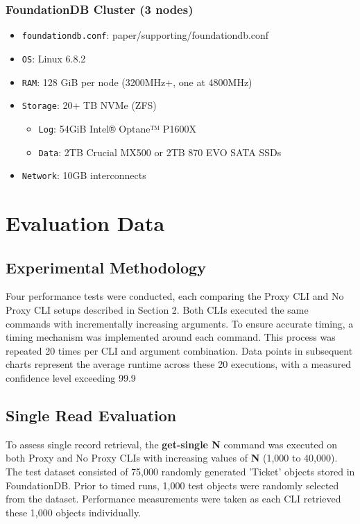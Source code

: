\documentclass[sigconf]{acmart}
\begin{document}
\subsubsection{FoundationDB Cluster (3 nodes)}

\begin{itemize}
    \item {\texttt{foundationdb.conf}}: paper/supporting/foundationdb.conf
    \item {\texttt{OS}}: Linux 6.8.2
    \item{\texttt{RAM}}: 128 GiB per node (3200MHz+, one at 4800MHz)
    \item{\texttt{Storage}}: 20+ TB NVMe (ZFS)
    \begin{itemize}
        \item{\texttt{Log}}: 54GiB Intel® Optane™ P1600X
        \item{\texttt{Data}}: 2TB Crucial MX500 or 2TB 870 EVO SATA SSDs
    \end{itemize}
    \item{\texttt{Network}}: 10GB interconnects
\end{itemize}

\section{Evaluation Data}

\subsection{Experimental Methodology}

Four performance tests were conducted, each comparing the Proxy CLI and No Proxy CLI setups described in Section 2. Both CLIs executed the same commands with incrementally increasing arguments. To ensure accurate timing, a timing mechanism was implemented around each command. This process was repeated 20 times per CLI and argument combination. Data points in subsequent charts represent the average runtime across these 20 executions, with a measured confidence level exceeding 99.9%

\subsection{Single Read Evaluation}

To assess single record retrieval, the \textbf{get-single N} command was executed on both Proxy and No Proxy CLIs with increasing values of \textbf{N} (1,000 to 40,000). The test dataset consisted of 75,000 randomly generated 'Ticket' objects stored in FoundationDB. Prior to timed runs, 1,000 test objects were randomly selected from the dataset. Performance measurements were taken as each CLI retrieved these 1,000 objects individually.
\end{document}

